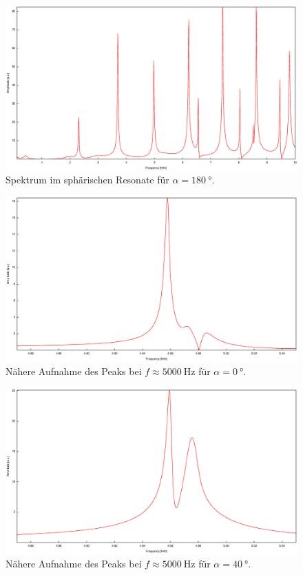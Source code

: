 \begin{figure}
\centering
\includegraphics[width=\linewidth-60pt,height=\textheight-60pt,keepaspectratio]{FP-V23data/2.1_180degree.eps}
\caption{Spektrum im sphärischen Resonate für $\alpha=\SI{180}{\degree}$.}
\label{fig:Overview2}
\end{figure}
\begin{figure}
\centering
\includegraphics[width=\linewidth-60pt,height=\textheight-60pt,keepaspectratio]{FP-V23data/2.2_0degree.eps}
\caption{Nähere Aufnahme des Peaks bei $f\approx\SI{5000}{\hertz}$ für $\alpha=\SI{0}{\degree}$.}
\label{fig:5k_Peak1}
\end{figure}
\begin{figure}
\centering
\includegraphics[width=\linewidth-60pt,height=\textheight-60pt,keepaspectratio]{FP-V23data/2.2_40degree.eps}
\caption{Nähere Aufnahme des Peaks bei $f\approx\SI{5000}{\hertz}$ für $\alpha=\SI{40}{\degree}$.}
\label{fig:5k_Peak2}
\end{figure}
